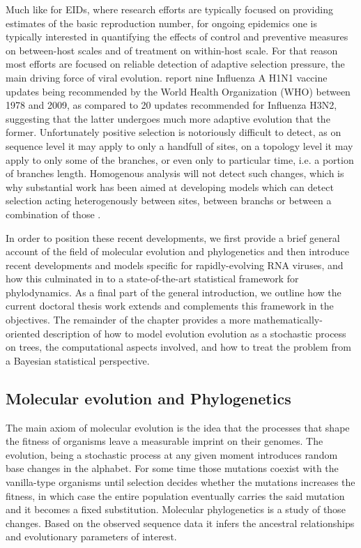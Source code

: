 Much like for EIDs, where research efforts are typically focused on providing estimates of the basic reproduction number, for ongoing epidemics one is typically interested in quantifying the effects of control and preventive measures on between-host scales and of treatment on within-host scale.
For that reason most efforts are focused on reliable detection of adaptive selection pressure, the main driving force of viral evolution.
\cite{Volz2013} report nine Influenza A H1N1 vaccine updates being recommended by the World Health Organization (WHO) between 1978 and 2009, as compared to 20 updates recommended for Influenza H3N2, suggesting that the latter undergoes much more adaptive evolution that the former.
Unfortunately positive selection is notoriously difficult to detect, as on sequence level it may apply to only a handfull of sites, on a topology level it may apply to only some of the branches, or even only to particular time, i.e. a portion of branches length.
Homogenous analysis will not detect such changes, which is why substantial work has been aimed at developing models which can detect selection acting heterogenously between sites, between branchs or between a combination of those \citep{NY98, Pond2005a, Goode2008}.

In order to position these recent developments, we first provide a brief general account of the field of molecular evolution and phylogenetics and then introduce recent developments and models specific for rapidly-evolving RNA viruses, and how this culminated in to a state-of-the-art statistical framework for phylodynamics. As a final part of the general introduction, we outline how the current doctoral thesis work extends and complements this framework in the objectives.
The remainder of the chapter provides a more mathematically-oriented description of how to model evolution evolution as a stochastic process on trees, the computational aspects involved, and how to treat the problem from a Bayesian statistical perspective.

\subsection{Molecular evolution and Phylogenetics\label{sub:molevol}}

The main axiom of molecular evolution is the idea that the processes that shape the fitness of organisms leave a measurable imprint on their genomes.
The evolution, being a stochastic process at any given moment introduces random base changes in the alphabet.
For some time those mutations coexist with the vanilla-type organisms until selection decides whether the mutations increases the fitness, in which case the entire population eventually carries the said mutation and it becomes a fixed substitution.  
Molecular phylogenetics is a study of those changes.
Based on the observed sequence data it infers the ancestral relationships and evolutionary parameters of interest.

